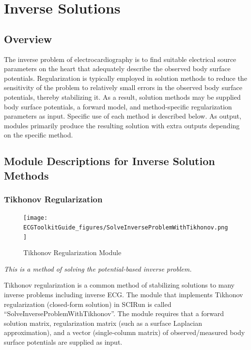 \chapter{Inverse Solutions}
\label{ch:inv}

\section{Overview}

The inverse problem of electrocardiography is to find suitable electrical source parameters on the heart that adequately describe the observed body surface potentials. Regularization is typically employed in solution methods to reduce the sensitivity of the problem to relatively small errors in the observed body surface potentials, thereby stabilizing it. As a result, solution methods may be supplied body surface potentials, a forward model, and method-specific regularization parameters as input. Specific use of each method is described below. As output, modules primarily produce the resulting solution with extra outputs depending on the specific method.

\section{Module Descriptions for Inverse Solution Methods}

\subsection{Tikhonov Regularization}

\begin{figure}[H]
\begin{center}
\texttt{[image: ECGToolkitGuide\_figures/SolveInverseProblemWithTikhonov.png]}
\caption{Tikhonov Regularization Module}
\label{tikhonov}
\end{center}
\end{figure}

\vspace{5pt}\textit{This is a method of solving the potential-based inverse problem.}\vspace{5pt}

Tikhonov regularization is a common method of stabilizing solutions to many inverse problems including inverse ECG. The module that implements Tikhonov regularization (closed-form solution) in SCIRun is called ``SolveInverseProblemWithTikhonov''. The module requires that a forward solution matrix, regularization matrix (such as a surface Laplacian approximation), and a vector (single-column matrix) of observed/measured body surface potentials are supplied as input.

